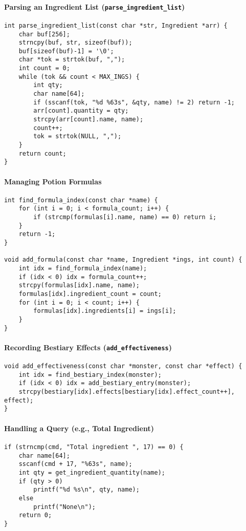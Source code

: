 \documentclass[12pt,a4paper]{article}
\begin{document}
\paragraph{Parsing an Ingredient List (\texttt{parse\_ingredient\_list})}
\begin{lstlisting}
int parse_ingredient_list(const char *str, Ingredient *arr) {
    char buf[256];
    strncpy(buf, str, sizeof(buf));
    buf[sizeof(buf)-1] = '\0';
    char *tok = strtok(buf, ",");
    int count = 0;
    while (tok && count < MAX_INGS) {
        int qty;
        char name[64];
        if (sscanf(tok, "%d %63s", &qty, name) != 2) return -1;
        arr[count].quantity = qty;
        strcpy(arr[count].name, name);
        count++;
        tok = strtok(NULL, ",");
    }
    return count;
}
\end{lstlisting}

\paragraph{Managing Potion Formulas}
\begin{lstlisting}
int find_formula_index(const char *name) {
    for (int i = 0; i < formula_count; i++) {
        if (strcmp(formulas[i].name, name) == 0) return i;
    }
    return -1;
}

void add_formula(const char *name, Ingredient *ings, int count) {
    int idx = find_formula_index(name);
    if (idx < 0) idx = formula_count++;
    strcpy(formulas[idx].name, name);
    formulas[idx].ingredient_count = count;
    for (int i = 0; i < count; i++) {
        formulas[idx].ingredients[i] = ings[i];
    }
}
\end{lstlisting}

\paragraph{Recording Bestiary Effects (\texttt{add\_effectiveness})}
\begin{lstlisting}
void add_effectiveness(const char *monster, const char *effect) {
    int idx = find_bestiary_index(monster);
    if (idx < 0) idx = add_bestiary_entry(monster);
    strcpy(bestiary[idx].effects[bestiary[idx].effect_count++], effect);
}
\end{lstlisting}

\paragraph{Handling a Query (e.g., Total Ingredient)}
\begin{lstlisting}
if (strncmp(cmd, "Total ingredient ", 17) == 0) {
    char name[64];
    sscanf(cmd + 17, "%63s", name);
    int qty = get_ingredient_quantity(name);
    if (qty > 0)
        printf("%d %s\n", qty, name);
    else
        printf("None\n");
    return 0;
}
\end{lstlisting}
\end{document}
